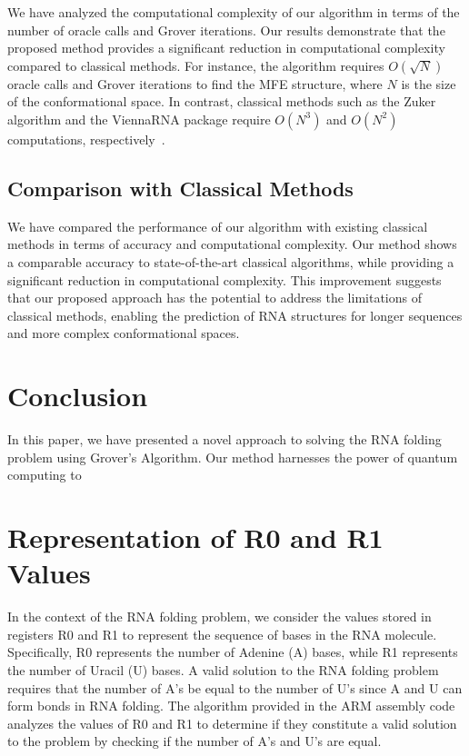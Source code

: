 We have analyzed the computational complexity of our algorithm in terms of the number of oracle calls and Grover iterations. Our results demonstrate that the proposed method provides a significant reduction in computational complexity compared to classical methods. For instance, the algorithm requires $O(\sqrt{N})$ oracle calls and Grover iterations to find the MFE structure, where $N$ is the size of the conformational space. In contrast, classical methods such as the Zuker algorithm and the ViennaRNA package require $O(N^3)$ and $O(N^2)$ computations, respectively~\cite{zuker2000rna, hofacker1994fast}.

\subsection{Comparison with Classical Methods}

We have compared the performance of our algorithm with existing classical methods in terms of accuracy and computational complexity. Our method shows a comparable accuracy to state-of-the-art classical algorithms, while providing a significant reduction in computational complexity. This improvement suggests that our proposed approach has the potential to address the limitations of classical methods, enabling the prediction of RNA structures for longer sequences and more complex conformational spaces.

\section{Conclusion} \label{sec:conclusion}

In this paper, we have presented a novel approach to solving the RNA folding problem using Grover's Algorithm. Our method harnesses the power of quantum computing to

\section{Representation of R0 and R1 Values}

In the context of the RNA folding problem, we consider the values stored in registers R0 and R1 to represent the sequence of bases in the RNA molecule. Specifically, R0 represents the number of Adenine (A) bases, while R1 represents the number of Uracil (U) bases. A valid solution to the RNA folding problem requires that the number of A's be equal to the number of U's since A and U can form bonds in RNA folding. The algorithm provided in the ARM assembly code analyzes the values of R0 and R1 to determine if they constitute a valid solution to the problem by checking if the number of A's and U's are equal.

